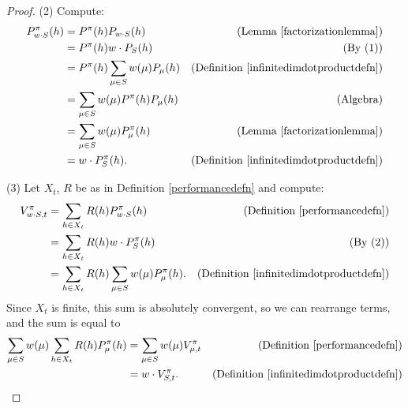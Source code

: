 \documentclass[twoside]{article}
\begin{document}
\begin{proof}
    (2) Compute:
    \begin{align*}
        P^\pi_{w\cdot S}(h)
            &= P^\pi(h) P_{w\cdot S}(h)
                &\mbox{(Lemma \ref{factorizationlemma})}\\
            &= P^\pi(h) w\cdot P_{S}(h)
                &\mbox{(By (1))}\\
            &= P^\pi(h) \sum_{\mu\in S}w(\mu)P_\mu(h)
                &\mbox{(Definition \ref{infinitedimdotproductdefn})}\\
            &= \sum_{\mu\in S}w(\mu)P^\pi(h)P_\mu(h)
                &\mbox{(Algebra)}\\
            &= \sum_{\mu\in S}w(\mu)P^\pi_\mu(h)
                &\mbox{(Lemma \ref{factorizationlemma})}\\
            &= w\cdot P^\pi_{S}(h).
                &\mbox{(Definition \ref{infinitedimdotproductdefn})}
    \end{align*}

    (3) Let $X_t$, $R$ be as in Definition \ref{performancedefn} and compute:
    \begin{align*}
        V^\pi_{w\cdot S,t}
            &= \sum_{h\in X_t}R(h)P^\pi_{w\cdot S}(h)
                &\mbox{(Definition \ref{performancedefn})}\\
            &= \sum_{h\in X_t}R(h)w\cdot P^\pi_{S}(h)
                &\mbox{(By (2))}\\
            &= \sum_{h\in X_t}R(h)\sum_{\mu\in S}w(\mu)P^\pi_\mu(h).
                &\mbox{(Definition \ref{infinitedimdotproductdefn})}
    \end{align*}
    Since $X_t$ is finite, this sum is absolutely convergent, so we can
    rearrange terms, and the sum is equal to
    \begin{align*}
        \sum_{\mu\in S}w(\mu)\sum_{h\in X_t}R(h)P^\pi_\mu(h)
            &= \sum_{\mu\in S}w(\mu)V^\pi_{\mu,t}
                &\mbox{(Definition \ref{performancedefn})}\\
            &= w\cdot V^\pi_{S,t}.
                &\mbox{(Definition \ref{infinitedimdotproductdefn})}
    \end{align*}


\end{proof}
\end{document}
